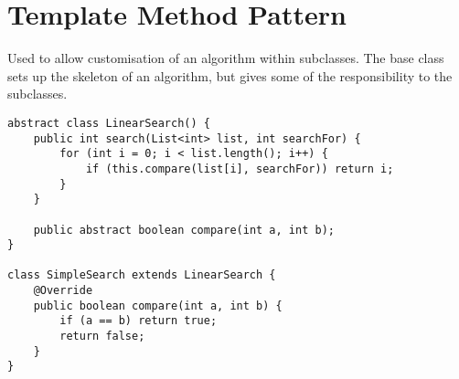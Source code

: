 \section{Template Method Pattern}
Used to allow customisation of an algorithm within subclasses. The base class sets up the skeleton of an algorithm, but gives some of the responsibility to the subclasses.

\begin{lstlisting}
abstract class LinearSearch() {
    public int search(List<int> list, int searchFor) {
        for (int i = 0; i < list.length(); i++) {
            if (this.compare(list[i], searchFor)) return i;
        }
    }

    public abstract boolean compare(int a, int b);
}

class SimpleSearch extends LinearSearch {
    @Override
    public boolean compare(int a, int b) {
        if (a == b) return true;
        return false;
    }
}

\end{lstlisting}